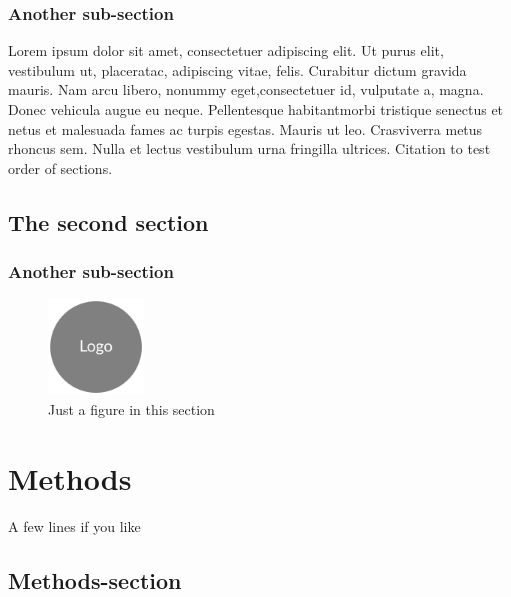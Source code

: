 \documentclass[a4paper, oneside, 11pt]{book}
\begin{document}
    \subsection{Another sub-section}
    Lorem ipsum dolor sit amet, consectetuer adipiscing elit. Ut purus elit, vestibulum ut, placeratac, adipiscing vitae, felis. Curabitur dictum gravida mauris. Nam arcu libero, nonummy eget,consectetuer id, vulputate a, magna. Donec vehicula augue eu neque. Pellentesque habitantmorbi tristique senectus et netus et malesuada fames ac turpis egestas. Mauris ut leo. Crasviverra metus rhoncus sem. Nulla et lectus vestibulum urna fringilla ultrices.
    Citation to test order of sections.

\section{The second section}

\subsection{Another sub-section}
\lipsum[1-3]
\begin{figure}
  \centering
	\includegraphics[width=1in, keepaspectratio]{logo.png}
	\caption[Short Caption]{\small Just a figure in this section}
\end{figure}
\lipsum[1]

\afterpage{\clearpage}
\FloatBarrier


\chapter{Methods}

A few lines if you like

\section{Methods-section}
\lipsum[1-2]
\end{document}
